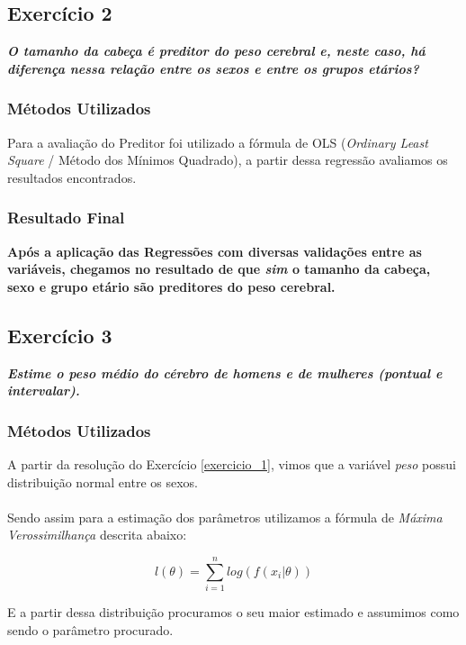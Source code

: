 \documentclass[12pt, a4paper]{article}
\begin{document}
	\subsection{Exercício 2} \label{exercicio_2}
	\textbf{\textit{O tamanho da cabeça é preditor do peso cerebral e, neste caso, há diferença nessa relação entre os sexos e entre os grupos etários?}}
	
	\subsubsection{Métodos Utilizados}
	Para a avaliação do Preditor foi utilizado a fórmula de OLS (\emph{Ordinary Least Square} / Método dos Mínimos Quadrado), a partir dessa regressão avaliamos os resultados encontrados.
	
	\subsubsection{Resultado Final}
	\textbf{Após a aplicação das Regressões com diversas validações entre as variáveis, chegamos no resultado de que \emph{sim} o tamanho da cabeça, sexo e grupo etário são preditores do peso cerebral.}
	
	\subsection{Exercício 3} \label{exercicio_3}
	\textbf{\textit{Estime o peso médio do cérebro de homens e de mulheres (pontual e intervalar).}}
	
	
    \subsubsection{Métodos Utilizados}
    A partir da resolução do Exercício \ref{exercicio_1}, vimos que a variável \emph{peso} possui distribuição normal entre os sexos.\\ \\
    Sendo assim para a estimação dos parâmetros utilizamos a fórmula de \emph{Máxima Verossimilhança} descrita abaixo:
    
    \begin{equation*}
     l(\theta) = \sum_{i=1}^{n}log(f(x_i|\theta))
    \end{equation*}
    
    E a partir dessa distribuição procuramos o seu maior estimado e assumimos como sendo o parâmetro procurado.\\
    
\end{document}
